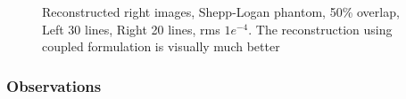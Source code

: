 \begin{enumerate}
\vspace{-0.2in}
\begin{figure}[b!]
\hspace{0.4in}
\hspace{0.2in}
\caption [Reconstructed right images, Shepp-Logan phantom, 50\% overlap,  Left 30 lines, Right 20 lines, rms $1e^{-4}$]{Reconstructed right images, Shepp-Logan phantom, 50\% overlap,  Left 30 lines, Right 20 lines, rms $1e^{-4}$. The reconstruction using coupled formulation is visually much better}
\label{fig:expt36}
\end{figure}
\end{enumerate}
\newpage
\subsubsection{Observations}

